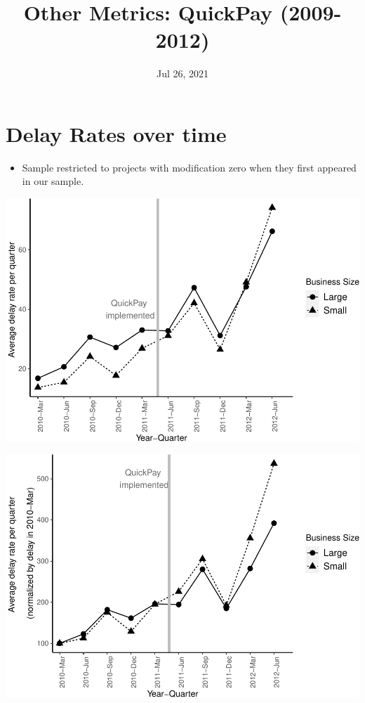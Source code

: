 \documentclass[]{article}
\title{Other Metrics: QuickPay (2009-2012)}
\author{}
\date{\vspace{-2.5em}Jul 26, 2021}
\providecommand{\tightlist}{%
  \setlength{\itemsep}{0pt}\setlength{\parskip}{0pt}}
\begin{document}
\maketitle

\hypertarget{delay-rates-over-time}{%
\section{Delay Rates over time}\label{delay-rates-over-time}}

\begin{itemize}
\tightlist
\item
  Sample restricted to projects with modification zero when they first
  appeared in our sample.
\end{itemize}

\includegraphics{qp_first_delay_files/figure-latex/plot_relative_delay-1.pdf}

\includegraphics{qp_first_delay_files/figure-latex/normalized_plot-1.pdf}
\end{document}
